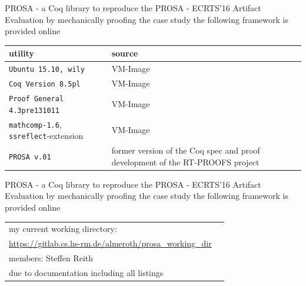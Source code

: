 \documentclass{beamer}
\begin{document}
          
      
      
      \begin{frame}{PROSA - a Coq library}
		to reproduce the PROSA - ECRTS’16 Artifact Evaluation by mechanically proofing the case study the following framework is provided online
		\begin{table}[]
			\begin{tabularx}{\linewidth}{l>{\raggedright}X}
				\textbf{utility}         & source				\tabularnewline
				\bottomrule
				\texttt{Ubuntu 15.10, wily}& VM-Image   			\tabularnewline           
				\texttt{Coq Version 8.5pl}   & VM-Image                    \tabularnewline                    
				\texttt{Proof General 4.3pre131011}		& VM-Image  \tabularnewline				
				\texttt{mathcomp-1.6}, \texttt{ssreflect}-extension	   & VM-Image \tabularnewline
				\bottomrule
				\texttt{PROSA v.01}		& former version of the Coq spec and proof development of the RT-PROOFS project\tabularnewline
				\bottomrule
			\end{tabularx}
			\label{tab:PROSA setup}
		\end{table}			 
      \end{frame}
      
      
  	  
  	 \begin{frame}{PROSA - a Coq library}
		to reproduce the PROSA - ECRTS’16 Artifact Evaluation by mechanically proofing the case study the following framework is provided online
		\begin{table}[]
			\begin{tabularx}{\linewidth}{l>{\raggedright}X}	
			my current working directory:\tabularnewline
			\url{https://gitlab.cs.hs-rm.de/almeroth/prosa_working_dir}\tabularnewline
			members: Steffen Reith \tabularnewline 
			due to documentation including all listings		
			\end{tabularx}
			\label{tab:Prosa_working_Dir}
		\end{table}			 
      \end{frame}  
\end{document}
